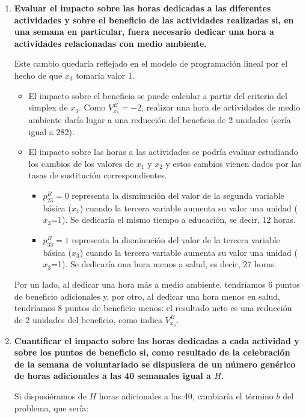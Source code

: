 \begin{enumerate}
    \item \textbf{Evaluar el impacto sobre las horas dedicadas a las diferentes actividades y sobre el beneficio de las actividades realizadas si, en una semana en particular, fuera necesario dedicar una hora a actividades relacionadas con medio ambiente.}

    Este cambio quedaría reflejado en el modelo de programación lineal por el hecho de que $x_3$ tomaría valor 1.  

    \begin{itemize}
        \item El impacto sobre el beneficio se puede calcular a partir del criterio del simplex de $x_3$. Como $V^B_{x_3} = -2$, realizar una hora de actividades de medio ambiente daría lugar a una reducción del beneficio de 2 unidades (sería igual a 282).
        \item El impacto sobre las horas a las actividades se podría evaluar estudiando los cambios de los valores de $x_1$ y $x_2$ y estos cambios vienen dados por las tasas de sustitución correspondientes.
        \begin{itemize}
            \item $p^B_{23} = 0$ representa la disminución del valor de la segunda variable básica ($x_1$) cuando la tercera variable aumenta su valor una unidad ($x_3$=1). Se dedicaría el mismo tiempo a educación, se decir, 12 horas.
            \item $p^B_{33} = 1$ representa la disminución del valor de la tercera variable básica ($x_3$) cuando la tercera variable aumenta su valor una unidad ($x_3$=1). Se dedicaría una hora menos a salud, es decir, 27 horas.
        \end{itemize}
    \end{itemize}

    Por un lado, al dedicar una hora más a medio ambiente, tendríamos 6 puntos de beneficio adicionales y, por otro, al dedicar una hora menos en salud, tendríamos 8 puntos de beneficio menos: el resultado neto es una reducción de 2 unidades del beneficio, como indica $V^B_{x_3}$.


    \item \textbf{Cuantificar el impacto sobre las horas dedicadas a cada actividad y sobre los puntos de beneficio si, como resultado de la celebración de la semana de voluntariado se dispusiera de un número genérico de horas adicionales a las 40 semanales igual a $H$.}

    Si dispusiéramos de $H$ horas adicionales a las 40, cambiaría el término $b$ del problema, que sería:


\end{enumerate}
